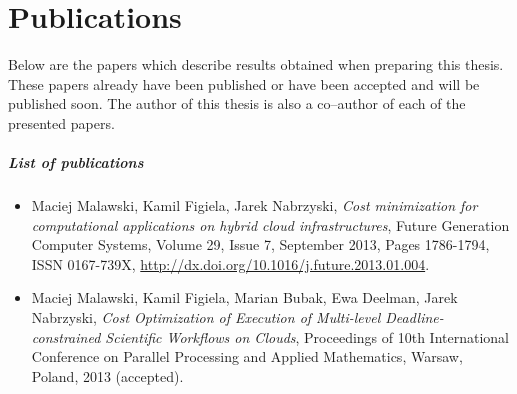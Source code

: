 \chapter{Publications} %

\label{AppendixB}

Below are the papers which describe results obtained when preparing this thesis. These papers already have been published or have been accepted and will be published soon. The author of this thesis is also a co--author of each of the presented papers.

\paragraph{List of publications}

\begin{itemize}
  \item Maciej Malawski, Kamil Figiela, Jarek Nabrzyski, \emph{Cost minimization for computational applications on hybrid cloud infrastructures}, Future Generation Computer Systems, Volume 29, Issue 7, September 2013, Pages 1786-1794, ISSN 0167-739X, \url{http://dx.doi.org/10.1016/j.future.2013.01.004}.
  \item Maciej Malawski, Kamil Figiela, Marian Bubak, Ewa Deelman, Jarek Nabrzyski, \emph{Cost Optimization of Execution of Multi-level Deadline-constrained Scientific Workflows on Clouds}, Proceedings of 10th International Conference on Parallel Processing and Applied Mathematics, Warsaw, Poland, 2013 (accepted).
\end{itemize}

\cleardoublepage
{} 


\cleardoublepage
{} 


